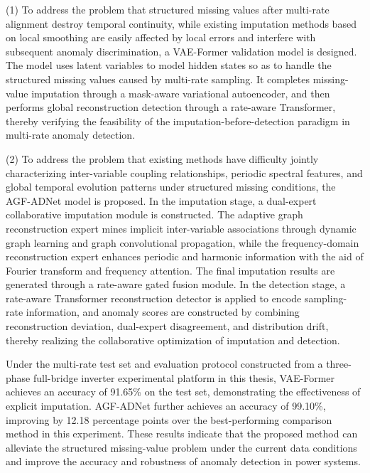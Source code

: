 \documentclass[bachelor, vlined]{DissertUESTC}
\begin{document}
	(1) To address the problem that structured missing values after multi-rate alignment destroy temporal continuity, while existing imputation methods based on local smoothing are easily affected by local errors and interfere with subsequent anomaly discrimination, a VAE-Former validation model is designed. The model uses latent variables to model hidden states so as to handle the structured missing values caused by multi-rate sampling. It completes missing-value imputation through a mask-aware variational autoencoder, and then performs global reconstruction detection through a rate-aware Transformer, thereby verifying the feasibility of the imputation-before-detection paradigm in multi-rate anomaly detection.

	(2) To address the problem that existing methods have difficulty jointly characterizing inter-variable coupling relationships, periodic spectral features, and global temporal evolution patterns under structured missing conditions, the AGF-ADNet model is proposed. In the imputation stage, a dual-expert collaborative imputation module is constructed. The adaptive graph reconstruction expert mines implicit inter-variable associations through dynamic graph learning and graph convolutional propagation, while the frequency-domain reconstruction expert enhances periodic and harmonic information with the aid of Fourier transform and frequency attention. The final imputation results are generated through a rate-aware gated fusion module. In the detection stage, a rate-aware Transformer reconstruction detector is applied to encode sampling-rate information, and anomaly scores are constructed by combining reconstruction deviation, dual-expert disagreement, and distribution drift, thereby realizing the collaborative optimization of imputation and detection.

	Under the multi-rate test set and evaluation protocol constructed from a three-phase full-bridge inverter experimental platform in this thesis, VAE-Former achieves an accuracy of 91.65\% on the test set, demonstrating the effectiveness of explicit imputation. AGF-ADNet further achieves an accuracy of 99.10\%, improving by 12.18 percentage points over the best-performing comparison method in this experiment. These results indicate that the proposed method can alleviate the structured missing-value problem under the current data conditions and improve the accuracy and robustness of anomaly detection in power systems.

\end{document}

